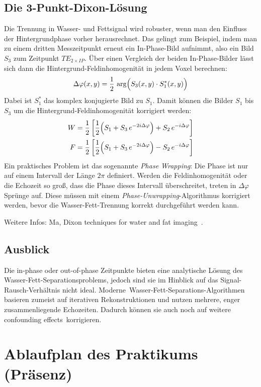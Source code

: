 \documentclass[a4paper,11pt]{article}
\newcommand{\dphi}{\Delta\varphi}
\newcommand{\TE}{\mathit{TE}}
\begin{document}
\subsection{Die 3-Punkt-Dixon-Lösung}
Die Trennung in Wasser- und Fettsignal wird robuster, wenn man den Einfluss der Hintergrundphase vorher herausrechnet. Das gelingt zum Beispiel, indem man zu einem dritten Messzeitpunkt erneut ein In-Phase-Bild aufnimmt, also ein Bild $S_3$ zum Zeitpunkt $\TE_{2\times\mathit{IP}}$. Über einen Vergleich der beiden In-Phase-Bilder lässt sich dann die Hintergrund-Feldinhomogenität in jedem Voxel berechnen:
\[
\dphi(x, y) = \frac{1}{2}\,\arg\Bigl(S_3(x, y) \cdot S_1^{*}(x, y)\Bigr)
\]
Dabei ist $S_1^{*}$ das komplex konjugierte Bild zu $S_1$. Damit können die Bilder $S_1$ bis $S_3$ um die Hintergrund-Feldinhomogenität korrigiert werden:
\begin{align*}
W &= \frac{1}{2}\left[\frac{1}{2}\Bigl(S_1 + S_3\,e^{-2i\dphi}\Bigr) + S_2\,e^{-i\dphi}\right]\\
F &= \frac{1}{2}\left[\frac{1}{2}\Bigl(S_1 + S_3\,e^{-2i\dphi}\Bigr) - S_2\,e^{-i\dphi}\right]
\end{align*}
Ein praktisches Problem ist das sogenannte \emph{Phase Wrapping}: Die Phase ist nur auf einem Intervall der Länge $2\pi$ definiert. Werden die Feldinhomogenität oder die Echozeit so groß, dass die Phase dieses Intervall überschreitet, treten in $\dphi$ Sprünge auf. Diese müssen mit einem \emph{Phase-Unwrapping}-Algorithmus korrigiert werden, bevor die Wasser-Fett-Trennung korrekt durchgeführt werden kann.

{\color{dunkel}Weitere Infos: Ma, \glqq Dixon techniques for water and fat imaging\grqq~\cite{ma2008}.\par}

\subsection{Ausblick}
Die in-phase oder out-of-phase Zeitpunkte bieten eine analytische Lösung des Wasser-Fett-Separationsproblems, jedoch sind sie im Hinblick auf das Signal-Rausch-Verhältnis nicht ideal. \glqq Moderne\grqq\ Wasser-Fett-Separations-Algorithmen basieren zumeist auf iterativen Rekonstruktionen und nutzen mehrere, enger zusammenliegende Echozeiten. Dadurch können sie auch noch auf weitere \glqq confounding effects\grqq\ korrigieren.

\section{Ablaufplan des Praktikums (Präsenz)}\label{sec:ablauf}
\end{document}
